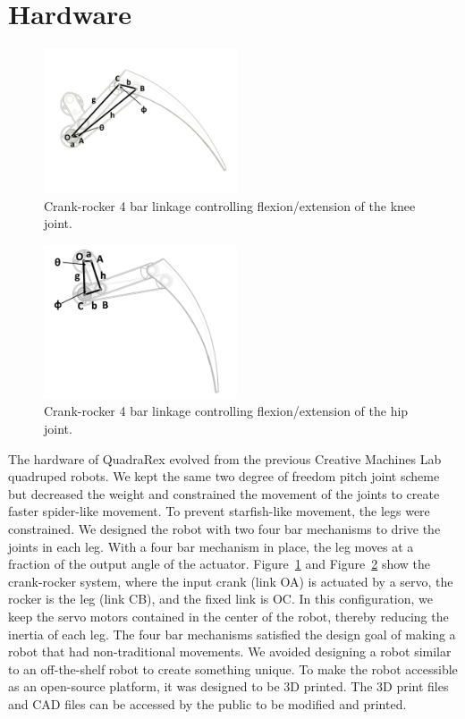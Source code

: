 \documentclass[letterpaper]{article}
\begin{document}
\section{Hardware}
\begin{figure}[t]
\begin{center}
\includegraphics[width=2.25in,angle=0]{fig3.pdf}
\caption{Crank-rocker 4 bar linkage controlling flexion/extension of the knee joint.}
\label{fig3}
\end{center}
\end{figure}
\begin{figure}[t]
\begin{center}
\includegraphics[width=2.25in,angle=0]{fig4.pdf}
\caption{Crank-rocker 4 bar linkage controlling flexion/extension of the hip joint.}
\label{fig4}
\end{center}
\end{figure}
The hardware of QuadraRex evolved from the previous Creative Machines Lab quadruped robots. We kept the same two degree of freedom pitch joint scheme but decreased the weight and constrained the movement of the joints to create faster spider-like movement. To prevent starfish-like movement, the legs were constrained. We designed the robot with two four bar mechanisms to drive the joints in each leg. With a four bar mechanism in place, the leg moves at a fraction of the output angle of the actuator. Figure~\ref{fig3} and Figure~\ref{fig4} show the crank-rocker system, where the input crank (link OA) is actuated by a servo, the rocker is the leg (link CB), and the fixed link is OC. In this configuration, we keep the servo motors contained in the center of the robot, thereby reducing the inertia of each leg. The four bar mechanisms satisfied the design goal of making a robot that had non-traditional movements. We avoided designing a robot similar to an off-the-shelf robot to create something unique. To make the robot accessible as an open-source platform, it was designed to be 3D printed. The 3D print files and CAD files can be accessed by the public to be modified and printed.
\end{document}
